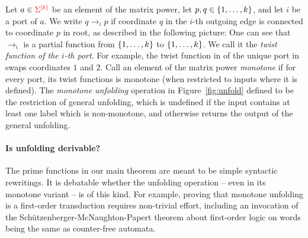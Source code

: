  Let  $a \in {\color{red}{\Sigma}}^{{\color{red}{[k]}}}$ be an element of the matrix power,  let $p,q \in \{1,\ldots,k\}$, and let  $i$ be a port of $a$. We write $
     q \to_i p$
if coordinate $q$ in the $i$-th outgoing edge  is connected to  coordinate $p$ in root, as described in the following picture:
One can see that $\to_i$ is a partial function from $\{1,\ldots,k\}$ to $\{1,\ldots,k\}$. We call it the  \emph{twist function of the $i$-th port}. For example, the twist function in of the unique port in 
swaps coordinates $1$ and $2$.  Call  an element of the matrix power  \emph{monotone} if for every port, its twist functions is monotone (when restricted to inputs where it is defined). The \emph{monotone unfolding} operation in Figure~\ref{fig:unfold} defined to be the restriction of general unfolding,  which  is undefined if the input contains at least one label which is non-monotone, and otherwise returns the output of the general unfolding.

\paragraph*{Is unfolding derivable?} The  prime functions in our main theorem  are meant to be simple syntactic rewritings. It is debatable whether the  unfolding operation -- even in its monotone variant -- is of this kind. For example, proving that monotone unfolding is a first-order transduction requires non-trivial effort, including an invocation of the Sch\"utzenberger-McNaughton-Papert theorem about first-order logic on words being the same as counter-free automata. 

